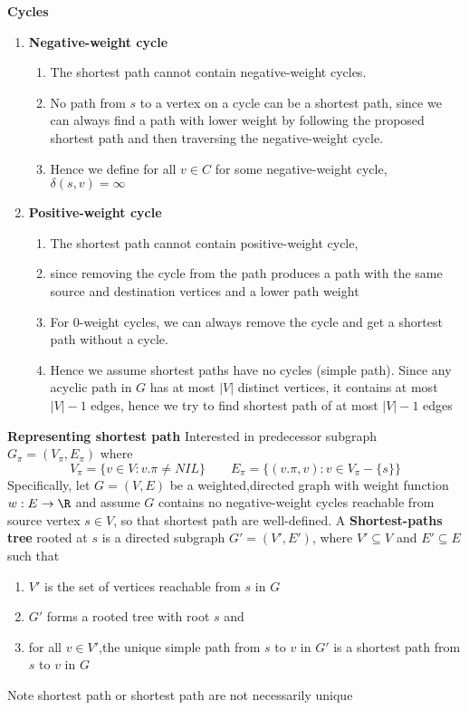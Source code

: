 \documentclass[11pt]{article}
\begin{document}
\begin{proposition*}
    \textbf{Cycles} 
    \begin{enumerate}
        \item \textbf{Negative-weight cycle} 
        \begin{enumerate}
            \item The shortest path cannot contain negative-weight cycles.
            \item No path from $s$ to a vertex on a cycle can be a shortest path, since we can always find a path with lower weight by following the proposed shortest path and then traversing the negative-weight cycle. 
            \item Hence we define for all $v \in C$ for some negative-weight cycle, $\delta(s,v) = \infty$
        \end{enumerate}
        \item \textbf{Positive-weight cycle} 
        \begin{enumerate}
            \item The shortest path cannot contain positive-weight cycle, 
            \item since removing the cycle from the path produces a path with the same source and destination vertices and a lower path weight
            \item For 0-weight cycles, we can always remove the cycle and get a shortest path without a cycle. 
            \item Hence we assume shortest paths have no cycles (simple path). Since any acyclic path in $G$ has at most $|V|$ distinct vertices, it contains at most $|V| - 1$ edges, hence we try to find shortest path of at most $|V| - 1$ edges
        \end{enumerate}
    \end{enumerate}
\end{proposition*}


\begin{defn*}
    \textbf{Representing shortest path} Interested in predecessor subgraph $G_{\pi} = (V_{\pi}, E_{\pi})$ where
    \[
        V_{\pi} = \{ v\in V: v.\pi \neq NIL\} \quad \quad E_{\pi} = \{ (v.\pi, v): v\in V_{\pi} - \{s\}\}
    \]
    Specifically, let $G = (V,E)$ be a weighted,directed graph with weight function $w:E\to \R$ and assume $G$ contains no negative-weight cycles reachable from source vertex $s\in V$, so that shortest path are well-defined. A \textbf{Shortest-paths tree} rooted at $s$ is a directed subgraph $G' = (V', E')$, where $V' \subseteq V$ and $E' \subseteq E$ such that 
    \begin{enumerate}
        \item $V'$ is the set of vertices reachable from $s$ in $G$
        \item $G'$ forms a rooted tree with root $s$ and 
        \item for all $v\in V'$,the unique simple path from $s$ to $v$ in $G'$ is a shortest path from $s$ to $v$ in $G$
    \end{enumerate}
    Note shortest path or shortest path are not necessarily unique
\end{defn*}
\end{document}
